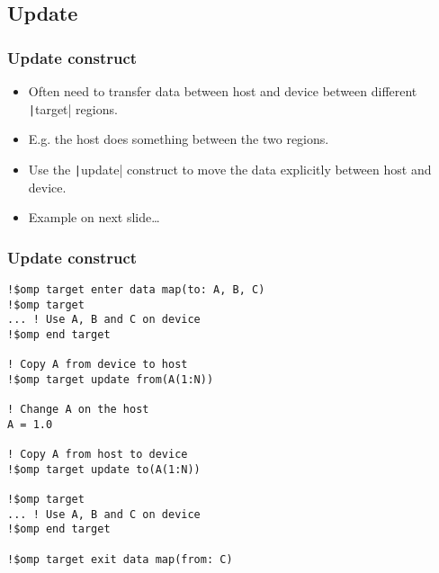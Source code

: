 \documentclass{beamer}
\begin{document}
\subsection{Update}
\begin{frame}
\frametitle{Update construct}
\begin{itemize}
  \item Often need to transfer data between host and device between different \texttt|target| regions.
  \item E.g. the host does something between the two regions.
  \item Use the \texttt|update| construct to move the data explicitly between host and device.
  \item Example on next slide\dots
\end{itemize}
\end{frame}

\begin{frame}[fragile]
\frametitle{Update construct}
\begin{verbatim}
!$omp target enter data map(to: A, B, C)
!$omp target
... ! Use A, B and C on device
!$omp end target

! Copy A from device to host
!$omp target update from(A(1:N))

! Change A on the host
A = 1.0

! Copy A from host to device
!$omp target update to(A(1:N))

!$omp target
... ! Use A, B and C on device
!$omp end target

!$omp target exit data map(from: C)
\end{verbatim}

\end{frame}

\end{document}
